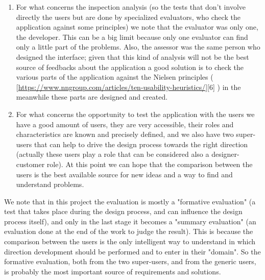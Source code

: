 \begin{enumerate}

\item For what concerns the inspection analysis (so the tests that don't involve directly the users but are done by specialized evaluators, who check the application against some principles) we note that the evaluator was only one, the developer. This can be a big limit because only one evaluator can find only a little part of the problems. Also, the assessor was the same person who designed the interface; given that this kind of analysis will not be the best source of feedbacks about the application a good solution is to check the various parts of the application against the Nielsen principles ( [\url{https://www.nngroup.com/articles/ten-usability-heuristics/}][6] ) in the meanwhile these parts are designed and created.

\item For what concerns the opportunity to test the application with the users we have a good amount of users, they are very accessible, their roles and characteristics are known and precisely defined, and we also have two super-users that can help to drive the design process towards the right direction (actually these users play a role that can be considered also a designer-customer role). At this point we can hope that the comparison between the users is the best available source for new ideas and a way to find and understand problems.    

\end{enumerate}

We note that in this project the evaluation is mostly a "formative evaluation" (a test that takes place during the design process, and can influence the design process itself), and only in the last stage it becomes a "summary evaluation" (an evaluation done at the end of the work to judge the result). This is because the comparison between the users is the only intelligent way to understand in which direction development should be performed and to enter in their "domain". So the formative evaluation, both from the two super-users, and from the generic users, is probably the most important source of requirements and solutions.   

